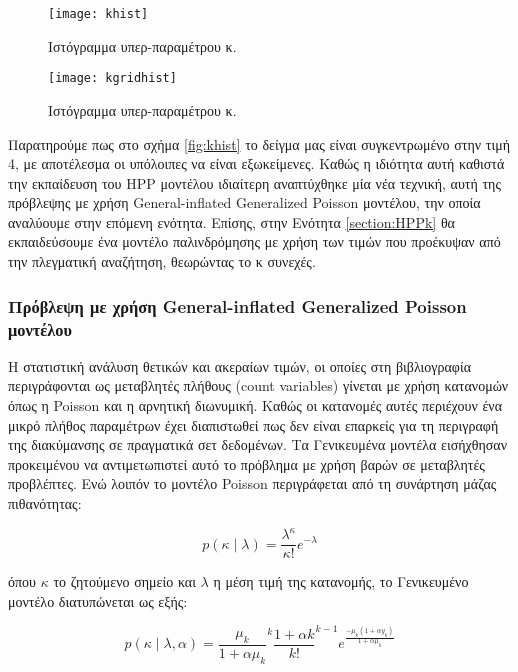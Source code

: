 \begin{figure}
	\begin{minipage}{0.48\textwidth}
	\texttt{[image: khist]}
	\caption{Ιστόγραμμα υπερ-παραμέτρου κ.}	
	\label{khist}
\end{minipage}
	\begin{minipage}{0.48\textwidth}
		\texttt{[image: kgridhist]}
		\caption{Ιστόγραμμα υπερ-παραμέτρου κ.}	
		\label{kgridhis}
	\end{minipage}
\end{figure}

Παρατηρούμε πως στο σχήμα \ref{fig:khist} το δείγμα μας είναι συγκεντρωμένο στην τιμή 4, με αποτέλεσμα οι υπόλοιπες να είναι εξωκείμενες. Καθώς η ιδιότητα αυτή καθιστά την εκπαίδευση του \gls{HPP} μοντέλου ιδιαίτερη αναπτύχθηκε μία νέα τεχνική, αυτή της πρόβλεψης με χρήση General-inflated Generalized Poisson μοντέλου, την οποία αναλύουμε στην επόμενη ενότητα. Επίσης, στην Ενότητα \ref{section:HPPk} θα εκπαιδεύσουμε ένα μοντέλο παλινδρόμησης με χρήση των τιμών που προέκυψαν από την πλεγματική αναζήτηση, θεωρώντας το κ συνεχές. 

\subsubsection{Πρόβλεψη με χρήση General-inflated Generalized Poisson μοντέλου} \label{section:GIGP}
Η στατιστική ανάλυση θετικών και ακεραίων τιμών, οι οποίες στη βιβλιογραφία περιγράφονται ως μεταβλητές πλήθους (count variables) γίνεται με χρήση κατανομών όπως η Poisson και η αρνητική διωνυμική. Καθώς οι κατανομές αυτές περιέχουν ένα μικρό πλήθος παραμέτρων έχει διαπιστωθεί πως δεν είναι επαρκείς για τη περιγραφή της διακύμανσης σε πραγματικά σετ δεδομένων. Τα Γενικευμένα μοντέλα \citep{Neld:Wedd:1972} εισήχθησαν προκειμένου να αντιμετωπιστεί αυτό το πρόβλημα με χρήση βαρών σε μεταβλητές προβλέπτες. Ενώ λοιπόν το μοντέλο Poisson περιγράφεται από τη συνάρτηση μάζας πιθανότητας:

\begin{equation}
 p(\kappa \mid \lambda) = \frac{\lambda^\kappa}{\kappa!} e^{-\lambda}
 \label{eq:poisson}
\end{equation}   

όπου $\kappa$ το ζητούμενο σημείο και $\lambda$ η μέση τιμή της κατανομής, το Γενικευμένο μοντέλο διατυπώνεται ως εξής:

\begin{equation}
 p(\kappa \mid \lambda, \alpha) = \frac{\mu_k}{1+\alpha \mu_k} ^k \frac{1+\alpha k}{k!}^{k-1} e^{\frac{-\mu_k(1+\alpha y_k)}{1+\alpha \mu_k}}
 \label{eq:gpoisson}
\end{equation}

